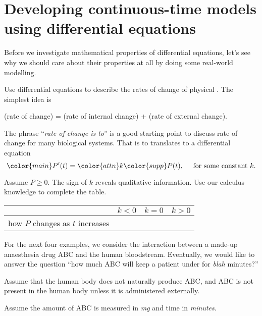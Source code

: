 \documentclass[../main.tex]{subfiles}
\begin{document}
 \section{Developing continuous-time models using differential equations}

Before we investigate mathematical properties of differential equations, let's see why we should care about their properties at all by doing some real-world modelling. 

\begin{method}
  Use differential equations to describe the rates of change of physical .  The simplest idea is
  \begin{center}
    (rate of change) = (rate of internal change) + (rate of external change).
  \end{center}
\end{method}

The phrase ``\emph{rate of change is  to}'' is a good starting point to discuss rate of  change for many biological systems.  That  is  to  translates to a differential equation 
\[
  {\color{main}P'(t)} = {\color{attn} k} {\color{supp} P(t)},\quad \text{ for some constant } k.
\]

Assume \(P \ge 0\).  The sign of \(k\) reveals qualitative information.  Use our calculus knowledge to complete the table.

\begin{table}[H]
  \centering
  \begin{tabular}{r|p{1.5in}|p{1.5in}|p{1.5in}}
  & \(k < 0\) & \(k = 0\) & \(k > 0\) \\ \midrule
    how \(P\) changes as \(t\) increases & & & \\[2ex]
  \end{tabular}
\end{table}

For the next four examples, we consider the interaction between a made-up anaesthesia drug ABC and the human bloodstream. Eventually, we would like to answer the question ``how much ABC will keep a patient under for \emph{blah} minutes?''

Assume that the human body does not naturally produce ABC, and ABC is not present in the human body unless it is administered externally. 

Assume the amount of ABC is measured in \emph{mg} and time in \emph{minutes}.
\end{document}
